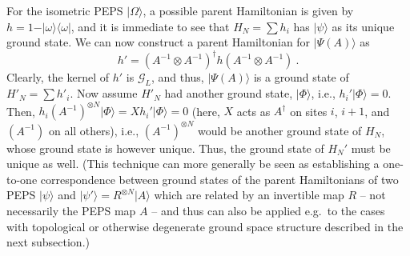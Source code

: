 \documentclass[rmp,aps,reprint,superscriptaddress,nobalancelastpage]{revtex4-1}
\newcommand{\ket}[1]{\vert#1\rangle}
\newcommand{\bra}[1]{\langle#1\vert}
\begin{document}
For the isometric PEPS $\ket\Omega$, a possible parent Hamiltonian is given by $h=1-\ket{\omega}\bra\omega$, and it is immediate to see that $H_N=\sum h_i$ has $\ket\psi$ as its unique ground state. We can now construct a parent Hamiltonian for $\ket{\Psi(A)}$ as
\begin{equation}
    \label{eq:4:deformed-parent-1}
    h' = (A^{-1}\otimes A^{-1})^\dagger h (A^{-1}\otimes A^{-1})\ .
\end{equation}
Clearly, the kernel of $h'$ is $\mathcal G_L$, and thus, $\ket{\Psi(A)}$ is a ground state of $H'_N=\sum h'_i$. Now assume $H'_N$ had another ground state, $\ket\Phi$, i.e., $h_i'\ket\Phi=0$. Then,
$h_i(A^{-1})^{\otimes N}\ket\Phi = Xh_i'\ket\Phi=0$ (here, $X$ acts as $A^\dagger$ on sites $i$, $i+1$, and $(A^{-1})$ on all others), i.e., $(A^{-1})^{\otimes N}$ would be another ground state of $H_N$, whose ground state is however unique. Thus, the ground state of $H_N'$ must be unique as well. (This technique can more generally be seen as establishing a one-to-one correspondence between ground states of the parent Hamiltonians of two PEPS $\ket\psi$ and $\ket{\psi'}=R^{\otimes N}\ket A$ which are related by an invertible map $R$ -- not necessarily the PEPS map $A$ -- and thus can also be applied e.g.\ to the cases with topological or otherwise degenerate ground space structure described in the next subsection.)
\end{document}
